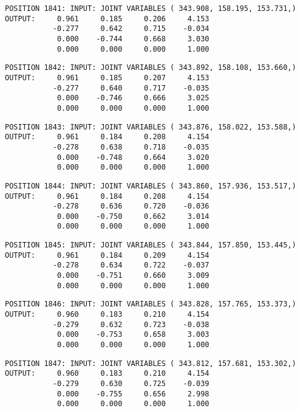 \begin{verbatim}
POSITION 1841: INPUT: JOINT VARIABLES ( 343.908, 158.195, 153.731,)
OUTPUT:     0.961     0.185     0.206     4.153
           -0.277     0.642     0.715    -0.034
            0.000    -0.744     0.668     3.030
            0.000     0.000     0.000     1.000
\end{verbatim} \pagebreak[1]\begin{verbatim}
POSITION 1842: INPUT: JOINT VARIABLES ( 343.892, 158.108, 153.660,)
OUTPUT:     0.961     0.185     0.207     4.153
           -0.277     0.640     0.717    -0.035
            0.000    -0.746     0.666     3.025
            0.000     0.000     0.000     1.000
\end{verbatim} \pagebreak[1]\begin{verbatim}
POSITION 1843: INPUT: JOINT VARIABLES ( 343.876, 158.022, 153.588,)
OUTPUT:     0.961     0.184     0.208     4.154
           -0.278     0.638     0.718    -0.035
            0.000    -0.748     0.664     3.020
            0.000     0.000     0.000     1.000
\end{verbatim} \pagebreak[1]\begin{verbatim}
POSITION 1844: INPUT: JOINT VARIABLES ( 343.860, 157.936, 153.517,)
OUTPUT:     0.961     0.184     0.208     4.154
           -0.278     0.636     0.720    -0.036
            0.000    -0.750     0.662     3.014
            0.000     0.000     0.000     1.000
\end{verbatim} \pagebreak[1]\begin{verbatim}
POSITION 1845: INPUT: JOINT VARIABLES ( 343.844, 157.850, 153.445,)
OUTPUT:     0.961     0.184     0.209     4.154
           -0.278     0.634     0.722    -0.037
            0.000    -0.751     0.660     3.009
            0.000     0.000     0.000     1.000
\end{verbatim} \pagebreak[1]\begin{verbatim}
POSITION 1846: INPUT: JOINT VARIABLES ( 343.828, 157.765, 153.373,)
OUTPUT:     0.960     0.183     0.210     4.154
           -0.279     0.632     0.723    -0.038
            0.000    -0.753     0.658     3.003
            0.000     0.000     0.000     1.000
\end{verbatim} \pagebreak[1]\begin{verbatim}
POSITION 1847: INPUT: JOINT VARIABLES ( 343.812, 157.681, 153.302,)
OUTPUT:     0.960     0.183     0.210     4.154
           -0.279     0.630     0.725    -0.039
            0.000    -0.755     0.656     2.998
            0.000     0.000     0.000     1.000
\end{verbatim} \pagebreak[1]\begin{verbatim}

\end{verbatim}
